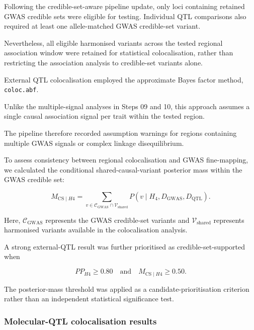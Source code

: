 \documentclass[11pt,a4paper]{article}
\begin{document}
Following the credible-set-aware pipeline update,
only loci containing retained GWAS credible sets
were eligible for testing. Individual QTL comparisons
also required at least one allele-matched GWAS
credible-set variant.

Nevertheless, all eligible harmonised variants across
the tested regional association window were retained
for statistical colocalisation, rather than restricting
the association analysis to credible-set variants alone.

External QTL colocalisation employed the approximate
Bayes factor method, \texttt{coloc.abf}.

Unlike the multiple-signal analyses in Steps 09
and 10, this approach assumes a single causal
association signal per trait within the tested region.

The pipeline therefore recorded assumption warnings
for regions containing multiple GWAS signals or
complex linkage disequilibrium.

To assess consistency between regional colocalisation
and GWAS fine-mapping, we calculated the conditional
shared-causal-variant posterior mass within the
GWAS credible set:

\begin{equation}
M_{\mathrm{CS}\mid H4}
=
\sum_{v\in\mathcal{C}_{\mathrm{GWAS}}
\cap\mathcal{V}_{\mathrm{shared}}}
P(v\mid H_4,D_{\mathrm{GWAS}},D_{\mathrm{QTL}}).
\label{eq:credible_set_h4}
\end{equation}

Here, $\mathcal{C}_{\mathrm{GWAS}}$ represents the
GWAS credible-set variants and
$\mathcal{V}_{\mathrm{shared}}$ represents harmonised
variants available in the colocalisation analysis.

A strong external-QTL result was further prioritised
as credible-set-supported when

\begin{equation}
PP_{H4}\geq0.80
\quad \mathrm{and} \quad
M_{\mathrm{CS}\mid H4}\geq0.50.
\end{equation}

The posterior-mass threshold was applied as a
candidate-prioritisation criterion rather than
an independent statistical significance test.


\subsubsection{Molecular-QTL colocalisation results}
\label{subsec:coloc_results}
\end{document}
